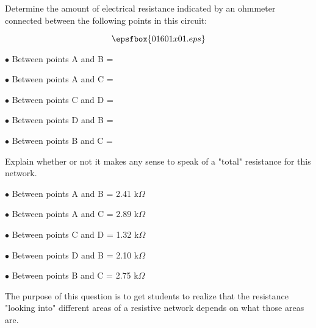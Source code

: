 

Determine the amount of electrical resistance indicated by an ohmmeter connected between the following points in this circuit:

$$\epsfbox{01601x01.eps}$$

\medskip
\item{$\bullet$} Between points A and B =
\item{$\bullet$} Between points A and C =
\item{$\bullet$} Between points C and D =
\item{$\bullet$} Between points D and B = 
\item{$\bullet$} Between points B and C = 
\medskip

Explain whether or not it makes any sense to speak of a "total" resistance for this network.







\medskip
\item{$\bullet$} Between points A and B = 2.41 k$\Omega$
\item{$\bullet$} Between points A and C = 2.89 k$\Omega$
\item{$\bullet$} Between points C and D = 1.32 k$\Omega$
\item{$\bullet$} Between points D and B = 2.10 k$\Omega$
\item{$\bullet$} Between points B and C = 2.75 k$\Omega$
\medskip







The purpose of this question is to get students to realize that the resistance "looking into" different areas of a resistive network depends on what those areas are.




